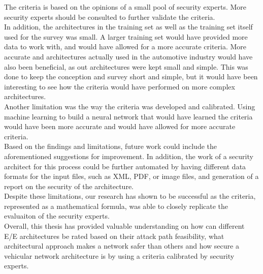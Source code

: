 The criteria is based on the opinions of a small pool of security experts.
More security experts should be consulted to further validate the criteria.\\
In addition, the architectures in the training set as well as the training set itself used for the survey was small.
A larger training set would have provided more data to work with, and would have allowed for a more accurate criteria.
More accurate and architectures actually used in the automotive industry would have also been beneficial, as out 
architectures were kept small and simple.
This was done to keep the conception and survey short and simple, but it would have been interesting to see how the criteria would have
performed on more complex architectures.\\
Another limitation was the way the criteria was developed and calibrated.
Using machine learning to build a neural network that would have learned the criteria would have 
been more accurate and would have allowed for more accurate criteria.\\

Based on the findings and limitations, future work could include the aforementioned suggestions for improvement.
In addition, the work of a security architect for this process could be further automated by 
having different data formats for the input files, such as XML, PDF, or image files, and generation of a report on the security of the architecture.\\

Despite these limitations, our research has shown to be successful as the criteria, represented as a mathematical formula, 
was able to closely replicate the evaluaiton of the security experts.\\

Overall, this thesis has provided valuable understanding on how can different E/E architectures be rated based on their attack path feasibility,
what architectural approach makes a network safer than others and how secure a vehicular network architecture is by using a criteria 
calibrated by security experts.\\